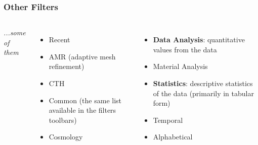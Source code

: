 \documentclass[]{beamer}
\begin{document}

\begin{frame}
\frametitle{Other Filters}
\begin{columns}[c] %

\textit{...some of them}
\begin{itemize}
\item Recent
\item AMR (adaptive mesh refinement)
\item CTH 
\item Common (the same list available in the filters toolbars)
\item Cosmology
\end{itemize}

\begin{itemize}
\item {\bf Data Analysis}: quantitative values from the data
\item Material Analysis
\item {\bf Statistics}: descriptive statistics of the data (primarily in tabular form)
\item Temporal
\item Alphabetical
\end{itemize}
\end{columns}
\end{frame}

\end{document}
